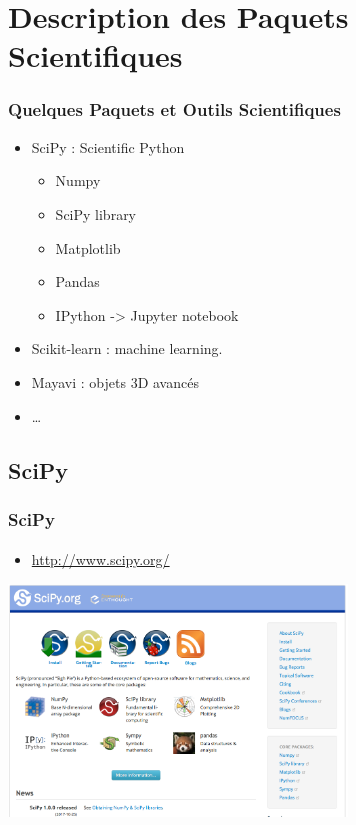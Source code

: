 \section{Description des Paquets Scientifiques}
\begin{frame}[fragile]
\frametitle{Quelques Paquets et Outils Scientifiques}
\begin{itemize}
 \item SciPy : Scientific Python 
 \begin{itemize}
  \item Numpy
  \item SciPy library
  \item Matplotlib
  \item Pandas
  \item IPython -> Jupyter notebook
 \end{itemize}
 \item Scikit-learn : machine learning.
 \item Mayavi : objets 3D avancés
 \item \dots
\end{itemize}
\end{frame}
\subsection{SciPy}
\begin{frame}[fragile]
\frametitle{SciPy}
\framesubtitle{}
\begin{itemize}
 \item \url{http://www.scipy.org/}
\end{itemize}
\begin{center}
\includegraphics[width=9cm]{./fig/scipy.png}
\end{center}
\end{frame}
